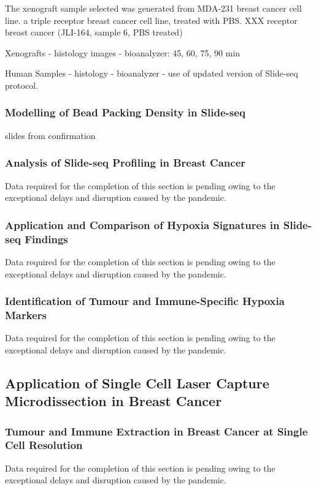 The xenograft sample selected was generated from MDA-231 breast cancer cell line. a triple receptor breast cancer cell line, treated with PBS.
 XXX receptor breast cancer (JLI-164, sample 6, PBS treated)


Xenografts
- histology images
- bioanalyzer: 45, 60, 75, 90 min


Human Samples
- histology
- bioanalyzer
- use of updated version of Slide-seq protocol.


\subsubsection{Modelling of Bead Packing Density in Slide-seq}
slides from confirmation

\subsubsection{Analysis of Slide-seq Profiling in Breast Cancer}
Data required for the completion of this section is pending owing to the exceptional delays and disruption caused by the pandemic. 

\subsubsection{Application and Comparison of Hypoxia Signatures in Slide-seq Findings}
Data required for the completion of this section is pending owing to the exceptional delays and disruption caused by the pandemic. 

\subsubsection{Identification of Tumour and Immune-Specific Hypoxia Markers}
Data required for the completion of this section is pending owing to the exceptional delays and disruption caused by the pandemic. 

\subsection{Application of Single Cell Laser Capture Microdissection in Breast Cancer}
\subsubsection{Tumour and Immune Extraction in Breast Cancer at Single Cell Resolution}
Data required for the completion of this section is pending owing to the exceptional delays and disruption caused by the pandemic. 

